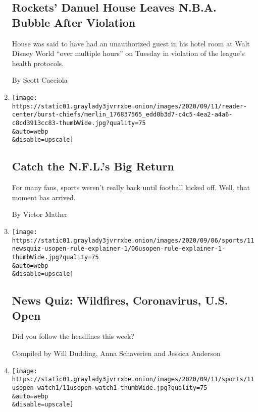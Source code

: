 \begin{enumerate}
{  \subsection{Rockets' Danuel House Leaves N.B.A. Bubble After
  Violation}\label{rockets-danuel-house-leaves-nba-bubble-after-violation}}

  House was said to have had an unauthorized guest in his hotel room at
  Walt Disney World ``over multiple hours'' on Tuesday in violation of
  the league's health protocols.

  By Scott Cacciola
\item
  \href{/interactive/2020/09/11/sports/football/nfl-week-1-preview.html}{}

  \texttt{[image: https://static01.graylady3jvrrxbe.onion/images/2020/09/11/reader-center/burst-chiefs/merlin\_176837565\_edd0b3d7-c4c5-4ea2-a4a6-c8cd3913cc83-thumbWide.jpg?quality=75\\\&auto=webp\\\&disable=upscale]}

  \hypertarget{catch-the-nfls-big-return}{%
  \subsection{Catch the N.F.L.'s Big
  Return}\label{catch-the-nfls-big-return}}

  For many fans, sports weren't really back until football kicked off.
  Well, that moment has arrived.

  By Victor Mather
\item
  \href{/interactive/2020/09/11/briefing/news-quiz-wildfires-coronavirus-tennis.html}{}

  \texttt{[image: https://static01.graylady3jvrrxbe.onion/images/2020/09/06/sports/11newsquiz-usopen-rule-explainer-1/06usopen-rule-explainer-1-thumbWide.jpg?quality=75\\\&auto=webp\\\&disable=upscale]}

  \hypertarget{news-quiz-wildfires-coronavirus-us-open}{%
  \subsection{News Quiz: Wildfires, Coronavirus, U.S.
  Open}\label{news-quiz-wildfires-coronavirus-us-open}}

  Did you follow the headlines this week?

  Compiled by Will Dudding, Anna Schaverien and Jessica Anderson
\item
  \href{/2020/09/11/sports/2020-us-open-what-to-watch.html}{}

  \texttt{[image: https://static01.graylady3jvrrxbe.onion/images/2020/09/11/sports/11usopen-watch1/11usopen-watch1-thumbWide.jpg?quality=75\\\&auto=webp\\\&disable=upscale]}


\end{enumerate}
